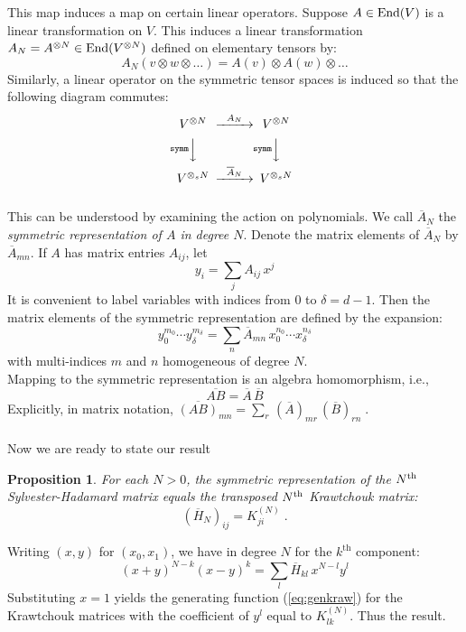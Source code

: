 \documentclass[12pt]{article}
\newtheorem{proposition}[theorem]{Proposition}
\def\FFF#1#2{K^{(#1)}_{#2}}
\def\dir#1.{x^{N-{#1}}y^{#1}}
\newenvironment{proof}{{\sl Proof:}\quad}{\hfill{\qed}\\ \noindent}
\def\qed{\qquad\framebox[7pt]\medskip\noindent}
\numberwithin{equation}{section}
\begin{document}
%
This  map induces a map on certain linear operators.
Suppose $A\in \hbox{End}(V)$ is a linear transformation on $V$.  This induces
a linear transformation $A_N=A^{\otimes N}\in \hbox{End}(V^{\otimes N}) $ defined on elementary tensors by:
$$
A_N(v\otimes w\otimes\ldots) = 
A(v)\otimes A(w)\otimes\ldots
$$
Similarly, a linear operator on the symmetric tensor spaces is induced so 
that the following diagram commutes:
$$
\begin{CD}
 V^{\otimes N}    @>A_N>>            V^{\otimes N}   \\
 @V{\symm}VV                          @V{\symm}VV    \\
 V^{\otimes_s N}  @>\overline A_N>>  V^{\otimes_s N}
\end{CD}
$$
~
\\
This can be understood by examining the action on polynomials.
We call  $\overline{A}_N$ the 
{\sl symmetric representation of $A$ in degree $N$}.  
Denote the matrix elements of $\overline{A}_N$ by $\overline{A}_{mn}$. 
If $A$ has matrix entries
$A_{ij}$, let
$$
       y_i=\sum_j A_{ij}\,x^j 
$$
It is convenient to label variables with indices from $0$ to $\delta=d-1$.
Then the matrix elements of the symmetric representation
are defined by the expansion:
$$
   y_0^{m_0}\cdots y_\delta^{m_\delta}=
               \sum_n \overline{A}_{mn}\,
                     x_0^{n_0}\cdots x_\delta^{n_\delta}
$$
with multi-indices $m$ and $n$ homogeneous of degree $N$.
\\

Mapping to the symmetric representation is an algebra homomorphism, i.e., 
$$
\overline{AB}=\overline{A}\,\overline{B}
$$
Explicitly, in matrix notation, 
$ 
\overline{(AB)}_{mn}=
          \sum\limits_r \,(\overline{A})_{mr}\,
                 (\overline{B})_{rn}  \;.
$ 
\\
\\

Now we are ready to state our result
\bigskip



\begin{proposition} 
\label{prop:h2k}
For each $N>0$, the symmetric representation of the $N^{\rm th}$ Sylvester-Hadamard 
matrix equals the transposed $N^{\rm th}$ Krawtchouk matrix:
$$ 
    (\overline{H}_N)_{ij} = \FFF{N}{ji}\;.
$$
\end{proposition}

\begin{proof}
Writing $(x,y)$ for $(x_0,x_1)$, we have in degree $N$ for the 
$k^{\mathrm{th}}$ component:
$$
        (x+y)^{N-k}(x-y)^k=\sum_l \overline{H}_{kl} \,\dir l.
$$
Substituting $x=1$ yields
the generating function (\ref{eq:genkraw}) for the Krawtchouk matrices with the
coefficient of $y^l$ equal to $\FFF{N}{lk}$. Thus the result.
\end{proof}
~
\\
\\
\end{document}
